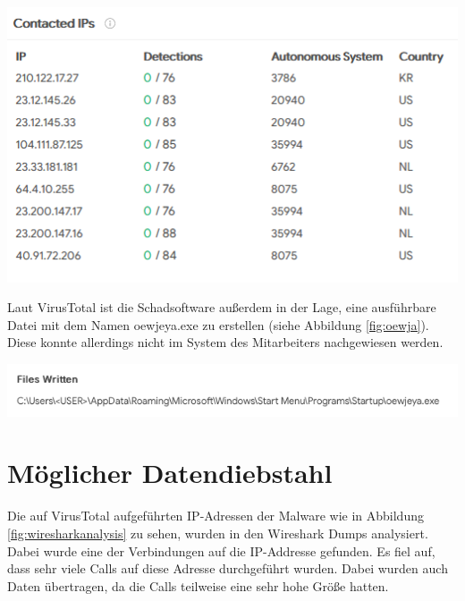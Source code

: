 \begin{center}
	\includegraphics[width=15.8cm]{figures/virustotal-fklm03.PNG}
	\label{fig:virustotal-fklm03}
\end{center}

Laut VirusTotal ist die Schadsoftware außerdem in der Lage, eine ausführbare Datei mit dem Namen oewjeya.exe zu erstellen (siehe Abbildung \ref{fig:oewja}).
Diese konnte allerdings nicht im System des Mitarbeiters nachgewiesen werden.

\begin{center}
	\includegraphics[width=15.8cm]{figures/oewja.png}
	\label{fig:oewja}
\end{center}

\chapter{Möglicher Datendiebstahl}
\label{ch:Datendiebstahl}
Die auf VirusTotal aufgeführten IP-Adressen der Malware wie in Abbildung \ref{fig:wiresharkanalysis} zu sehen, wurden in den Wireshark Dumps analysiert. Dabei wurde eine der Verbindungen auf die IP-Addresse  gefunden. Es fiel auf, dass sehr viele Calls auf diese Adresse durchgeführt wurden. Dabei wurden auch Daten übertragen, da die Calls teilweise eine sehr hohe Größe hatten.

